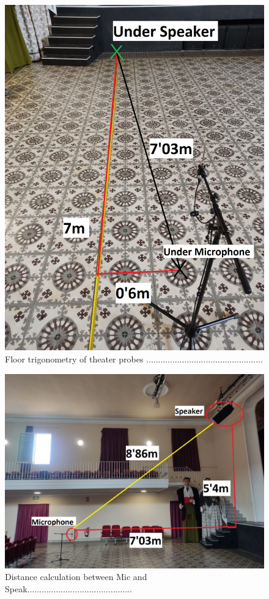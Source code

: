 \begin{figure}[H]
	\centering
	\includegraphics[width=0.6
	\linewidth]{Figures/Coro_floor_trigo.jpeg}
	\caption{Floor trigonometry of theater probes .................................................}
	\label{fig:Floor_section}
\end{figure}

\begin{figure}[H]
	\centering
	\includegraphics[width=1
	\linewidth]{Figures/Coro_section_trigo.jpeg}
	\caption{Distance calculation between Mic and Speak............................................}
	\label{fig:asdf}
\end{figure}

